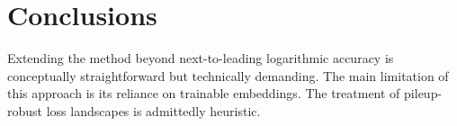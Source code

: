 \section{Conclusions}\label{sec:conclusions}

Extending the method beyond next-to-leading logarithmic accuracy is
conceptually straightforward but technically demanding. The main
limitation of this approach is its reliance on trainable embeddings. The
treatment of pileup-robust loss landscapes is admittedly heuristic.

